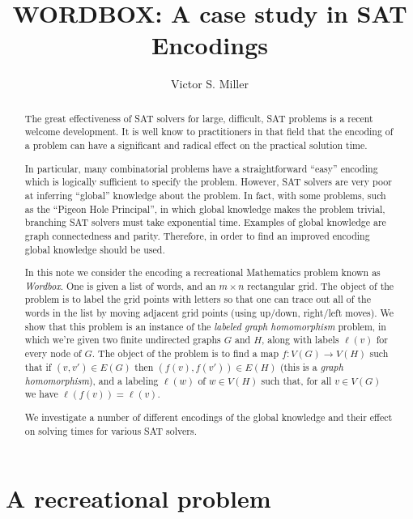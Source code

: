 \documentclass{article}
\title{WORDBOX: A case study in SAT Encodings}
\author{Victor S. Miller}
\affil{IDA Center for Communications Research, Princeton, NJ 08540
USA}
\begin{document}
\maketitle
\begin{abstract}
  The great effectiveness of SAT solvers for large, difficult, SAT
  problems is a recent welcome development.  It is well know to
  practitioners in that field that the encoding of a problem can have
  a significant and radical effect on the practical solution time.

  In particular, many combinatorial problems have a straightforward
  ``easy'' encoding which is logically sufficient to specify the
  problem.  However, SAT solvers are very poor at inferring ``global''
  knowledge about the problem.  In fact, with some problems, such as
  the ``Pigeon Hole Principal'', in which global knowledge makes the
  problem trivial, branching SAT solvers must take exponential time.
  Examples of global knowledge are graph connectedness and
  parity. Therefore, in order to find an improved encoding global
  knowledge should be used.

  In this note we consider the encoding a recreational Mathematics
  problem known as \emph{Wordbox}.  One is given a list of words, and
  an $m \times n$ rectangular grid.  The object of the problem is to
  label the grid points with letters so that one can trace out all of
  the words in the list by moving adjacent grid points (using up/down,
  right/left moves).  We show that this problem is an instance of the
  \emph{labeled graph homomorphism} problem, in which we're given two
  finite undirected graphs $G$ and $H$, along with labels $\ell(v)$ for
  every node of $G$.  The object of the problem is to find a map
  $f: V(G) \rightarrow V(H)$ such that if $(v,v') \in E(G)$ then
  $(f(v), f(v')) \in E(H)$ (this is a \emph{graph homomorphism}), and
  a labeling $\ell(w)$ of $w \in V(H)$ such that, for all $v \in V(G)$
  we have $\ell(f(v)) = \ell(v)$.

  We investigate a number of different encodings of the global
  knowledge and their effect on solving times for various SAT solvers.
\end{abstract}

\section{A recreational problem}
\label{sec:recreational}
\end{document}

